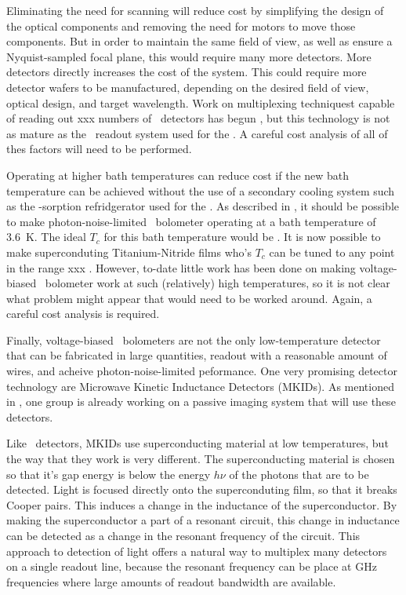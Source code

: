 Eliminating the need for scanning will reduce cost by simplifying the design of the optical components and removing the need for motors to move those components.
But in order to maintain the same field of view, as well as ensure a Nyquist-sampled focal plane, this would require many more detectors.
More detectors directly increases the cost of the system.
This could require more detector wafers to be manufactured, depending on the desired field of view, optical design, and target wavelength.
Work on multiplexing techniquest capable of reading out xxx numbers of \TES\ detectors has begun \cite{xxx}, but this technology is not as mature as the \TDM\ readout system used for the \Imager.
A careful cost analysis of all of thes factors will need to be performed.

Operating at higher bath temperatures can reduce cost if the new bath temperature can be achieved without the use of a secondary cooling system such as the -sorption refridgerator used for the \Imager.
As described in , it should be possible to make photon-noise-limited \TES\ bolometer operating at a bath temperature of \SI{3.6}{\K}.
The ideal $T_c$ for this bath temperature would be .
It is now possible to make superconduting Titanium-Nitride films who's $T_c$ can be tuned to any point in the range xxx \cite{xxx}.
However, to-date little work has been done on making voltage-biased \TES\ bolometer work at such (relatively) high temperatures, so it is not clear what problem might appear that would need to be worked around.
Again, a careful cost analysis is required.

Finally, voltage-biased \TES\ bolometers are not the only low-temperature detector that can be fabricated in large quantities, readout with a reasonable amount of wires, and acheive photon-noise-limited peformance.
One very promising detector technology are Microwave Kinetic Inductance Detectors (MKIDs).
As mentioned in , one group is already working on a passive imaging system that will use these detectors.

Like \TES\ detectors, MKIDs use superconducting material at low temperatures, but the way that they work is very different.
The superconducting material is chosen so that it's gap energy is below the energy $h \nu$ of the photons that are to be detected.
Light is focused directly onto the superconduting film, so that it breaks Cooper pairs.
This induces a change in the inductance of the superconductor.
By making the superconductor a part of a resonant circuit, this change in inductance can be detected as a change in the resonant frequency of the circuit.
This approach to detection of light offers a natural way to multiplex many detectors on a single readout line, because the resonant frequency can be place at GHz frequencies where large amounts of readout bandwidth are available.

